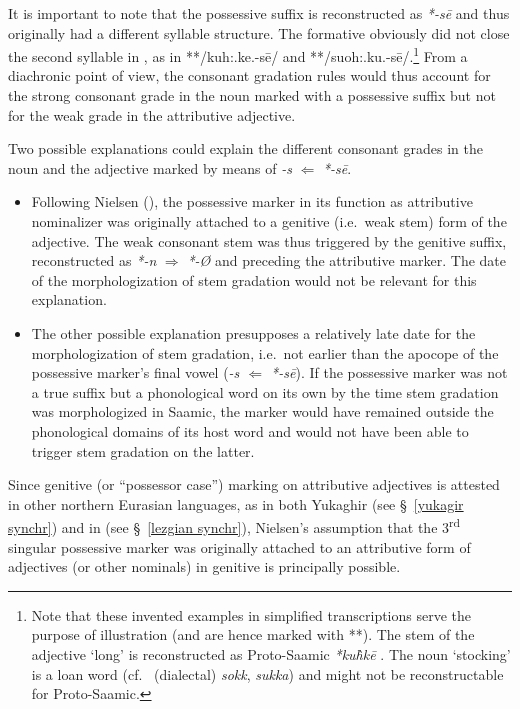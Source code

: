 {It is important to note that the possessive suffix is reconstructed as  \textit{*-sē} \cite[73]{sammallahti1998b} and thus originally had a different syllable structure. The formative obviously did not close the second syllable in , as in **/kuh:.ke.-sē/ and **/suoh:.ku.-sē/.\footnote{Note that these invented examples in simplified transcriptions serve the purpose of illustration (and are hence marked with **). The stem of the adjective ‘long’ is reconstructed as Proto\hyp{}Saamic \textit{*ku\`{h}kē} \cite[246]{sammallahti1998b}. The noun ‘stocking’ is a loan word (cf.~ (dialectal) \textit{sokk},  \textit{sukka}) and might not be reconstructable for Proto\hyp{}Saamic.} From a diachronic point of view, the consonant gradation rules would thus account for the strong consonant grade in the noun marked with a possessive suffix but not for the weak grade in the attributive adjective.
 
Two possible explanations could explain the different consonant grades in the noun and the adjective marked by means of \textit{-s} $\Leftarrow$ \textit{*-sē}.
\begin{itemize}
\item Following Nielsen (\citeyear{nielsen1945b}), the possessive marker in its function as attributive nominalizer was originally attached to a genitive (i.e.~weak stem) form of the adjective. The weak consonant stem was thus triggered by the genitive suffix, reconstructed as  \textit{*-n} $\Rightarrow$  \mbox{\textit{*-Ø}} \cite[65]{sammallahti1998b} and preceding the attributive marker. The date of the morphologization of stem gradation would not be relevant for this explanation.
\item The other possible explanation presupposes a relatively late date for the morphologization of stem gradation, i.e.~not earlier than the apocope of the possessive marker's final vowel (\textit{-s $\Leftarrow$ *-sē}). If the possessive marker was not a true suffix but a phonological word on its own by the time stem gradation was morphologized in Saamic, the marker would have remained outside the phonological domains of its host word and would not have been able to trigger stem gradation on the latter. 
\end{itemize}
Since genitive (or “possessor case”) marking on attributive adjectives is attested in other northern Eurasian languages, as in both Yukaghir (see \S~\ref{yukagir synchr}) and in  (see \S~\ref{lezgian synchr}), Nielsen's assumption that the 3\textsuperscript{rd} singular possessive marker was originally attached to an attributive form of adjectives (or other nominals) in genitive is principally possible. 

}
